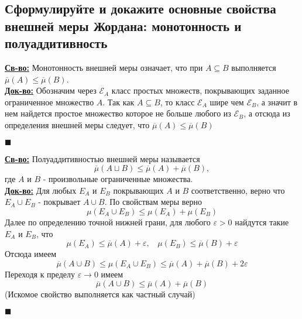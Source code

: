 
\subsection{Сформулируйте и докажите основные свойства внешней меры Жордана: монотонность и полуаддитивность} 

\textbf{\underline{Св-во:} } Монотонность внешней меры означает, что при $A \subseteq B$ выполняется $\overline{\mu}(A) \leq \overline{\mu}(B)$. \\
\textbf{\underline{Док-во:} } Обозначим через $\mathcal{E}_A$ класс простых множеств, покрывающих заданное ограниченное множество $A$. Так как $A \subseteq B$, то класс $\mathcal{E}_A$ шире чем $\mathcal{E}_B$, а значит в нем найдется простое множество которое не больше любого из $\mathcal{E}_B$, а отсюда из определения внешней меры следует, что $\overline{\mu}(A) \leq \overline{\mu}(B)$
\begin{flushright}
$\blacksquare$
\end{flushright}
\textbf{\underline{Св-во:} } Полуаддитивностью внешней меры называется 
$$\overline{\mu}(A\sqcup B) \leq \overline{\mu}(A) + \overline{\mu}(B),$$
где $A$ и $B$ - произвольные ограниченные множества. \\
\textbf{\underline{Док-во:} } Для любых $E_A$ и $E_B$ покрывающих $A$ и $B$ соответственно, верно что $E_A\cup E_B$ - покрывает $A\cup B$. По свойствам меры верно
$$\mu(E_A\cup E_B) \leq \mu(E_A) + \mu(E_B)$$
Далее по определению точной нижней грани, для любого $\varepsilon > 0$ найдутся такие $E_A$ и $E_B$, что 
$$\mu(E_A) \leq \overline{\mu}(A) + \varepsilon, \ \ \ \ \mu(E_B) \leq \overline{\mu}(B) + \varepsilon$$
Отсюда имеем
$$\overline{\mu}(A\cup B) \leq \mu(E_A\cup E_B) \leq \overline{\mu}(A) + \overline{\mu}(B) + 2\varepsilon$$
Переходя к пределу $\varepsilon \rightarrow 0$ имеем
$$\overline{\mu}(A\cup B) \leq \overline{\mu}(A) + \overline{\mu}(B)$$
(Искомое свойство выполняется как частный случай)
\begin{flushright}
$\blacksquare$
\end{flushright}
